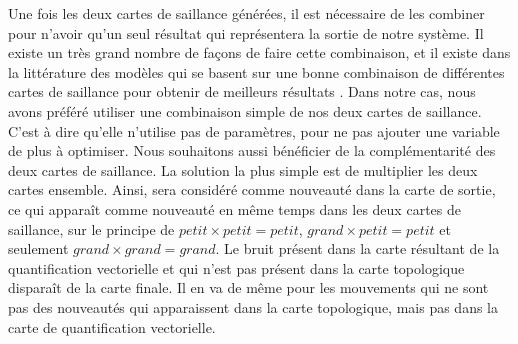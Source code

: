 	Une fois les deux cartes de saillance générées, il est nécessaire de les combiner pour n'avoir qu'un seul résultat qui représentera la sortie de notre système. Il existe un très grand nombre de façons de faire cette combinaison, et il existe dans la littérature des modèles qui se basent sur une bonne combinaison de différentes cartes de saillance pour obtenir de meilleurs résultats \cite{bianco2017combination}. Dans notre cas, nous avons préféré utiliser une combinaison simple de nos deux cartes de saillance. C'est à dire qu'elle n'utilise pas de paramètres, pour ne pas ajouter une variable de plus à optimiser. Nous souhaitons aussi bénéficier de la complémentarité des deux cartes de saillance. La solution la plus simple est de multiplier les deux cartes ensemble. Ainsi, sera considéré comme nouveauté dans la carte de sortie, ce qui apparaît comme nouveauté en même temps dans les deux cartes de saillance, sur le principe de $\textit{petit} \times \textit{petit} = \textit{petit}$, $\textit{grand} \times \textit{petit} = \textit{petit}$ et seulement $\textit{grand} \times \textit{grand} = \textit{grand}$. Le bruit présent dans la carte résultant de la quantification vectorielle et qui n'est pas présent dans la carte topologique disparaît de la carte finale. Il en va de même pour les mouvements qui ne sont pas des nouveautés qui apparaissent dans la carte topologique, mais pas dans la carte de quantification vectorielle.

